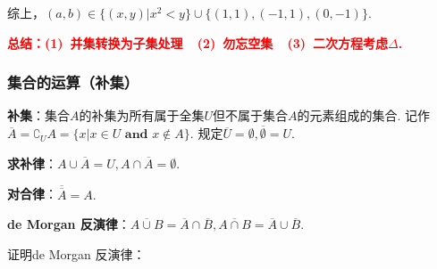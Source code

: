\documentclass[8pt]{article}
\begin{document}
				综上，$(a,b)\in\{(x,y)|x^2<y\}\cup\{(1,1), (-1, 1), (0, -1)\}.$

				\textcolor{red}{\textbf{总结：(1)\ 并集转换为子集处理\ \ (2)\ 勿忘空集\ \ (3)\ 二次方程考虑$\Delta$.}}

			\subsubsection{集合的运算（补集）}
				\textbf{补集}：集合$A$的补集为所有属于全集$U$但不属于集合$A$的元素组成的集合. 记作$\overline{A}=\complement_{U}A=\{x|x\in U \textbf{ and } x \notin A\}.$ 规定$\overline{U}=\emptyset, \overline{\emptyset}=U.$

				\textbf{求补律}：$A\cup\overline{A}=U, A\cap\overline{A}=\emptyset.$

				\textbf{对合律}：$\overline{\overline{A}}=A.$

				\textbf{de Morgan 反演律}：$\overline{A\cup B}=\overline{A}\cap\overline{B}, \overline{A\cap B}=\overline{A}\cup\overline{B}.$

				证明de Morgan 反演律：
\end{document}
